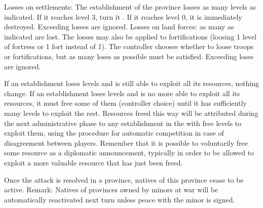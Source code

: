 \bparag Losses on settlements: The establishment of the province losses as
many levels as indicated. If it reaches level 3, turn it \Facemoins. If it
reaches level 0, it is immediately destroyed. Exceeding losses are ignored.
\bparag Losses on land forces: as many \LD as indicated are lost. The losses
may also be applied to fortifications (loosing 1 level of fortress or 1 fort
instead of 1\LD). The controller chooses whether to loose troops or
fortifications, but as many loses as possible must be satisfied. Exceeding
loses are ignored.

\bparag If an establishment loses levels and is still able to exploit all its
resources, nothing change.
\bparag If an establishment loses levels and is no more able to exploit all
its resources, it must free some of them (controller choice) until it has
sufficiently many levels to exploit the rest.
\bparag Resources freed this way will be attributed during the next
administrative phase to any establishment in the \Area with free levels to
exploit them, using the procedure for automatic competition in case of
disagreement between players.
\bparag Remember that it is possible to voluntarily free some resource as a
diplomatic announcement, typically in order to be allowed to exploit a more
valuable resource that has just been freed.

\bparag Once the attack is resolved in a province, natives of this province
cease to be active.
\bparag Remark: Natives of provinces owned by \ROTW minors at war will be
automatically reactivated next turn unless peace with the minor is signed.


